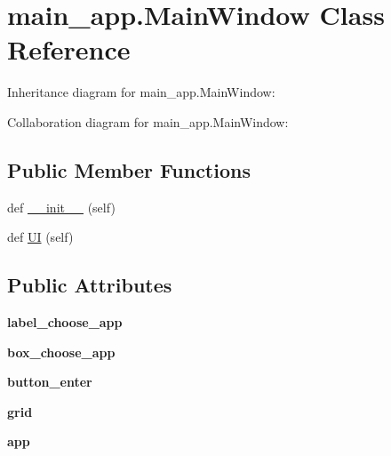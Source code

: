 \hypertarget{classmain__app_1_1MainWindow}{}\section{main\+\_\+app.\+Main\+Window Class Reference}
\label{classmain__app_1_1MainWindow}


Inheritance diagram for main\+\_\+app.\+Main\+Window\+:


Collaboration diagram for main\+\_\+app.\+Main\+Window\+:
\subsection*{Public Member Functions}
\begin{DoxyCompactItemize}
\item 
def \hyperlink{classmain__app_1_1MainWindow_a2a91845f7b97cfc7411a7b94833e8ea1}{\+\_\+\+\_\+init\+\_\+\+\_\+} (self)
\item 
def \hyperlink{classmain__app_1_1MainWindow_a1ef701ac0e322d763a7d23b8d7f95dba}{UI} (self)
\end{DoxyCompactItemize}
\subsection*{Public Attributes}
\begin{DoxyCompactItemize}
\item 
\mbox{\label{classmain__app_1_1MainWindow_ab28c83555937e8fb17debaaa7b3a1df1}} 
{\bfseries label\+\_\+choose\+\_\+app}
\item 
\mbox{\label{classmain__app_1_1MainWindow_a8a9060e24346f205aa73333f472ae3a6}} 
{\bfseries box\+\_\+choose\+\_\+app}
\item 
\mbox{\label{classmain__app_1_1MainWindow_a271ee9a6e2d6ab44269b53d5fba0d6b0}} 
{\bfseries button\+\_\+enter}
\item 
\mbox{\label{classmain__app_1_1MainWindow_a431d80f2f2ca1be1cbaba088b3ae921b}} 
{\bfseries grid}
\item 
\mbox{\label{classmain__app_1_1MainWindow_a63038263315d883d0830408209b83d10}} 
{\bfseries app}
\end{DoxyCompactItemize}


